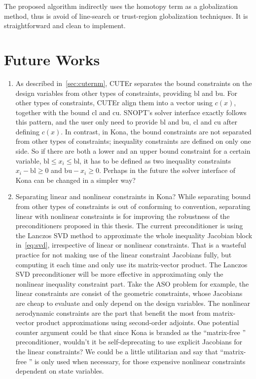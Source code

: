 The proposed algorithm indirectly uses the homotopy term as a globalization method, 
thus is avoid of line-search or trust-region globalization techniques. 
It is straightforward and clean to implement. 

\section{Future Works}

\begin{enumerate}
\item  As described in~\ref{sec:cuternm}, CUTEr separates 
the bound constraints on the design variables from other types of constraints, providing $\text{bl}$ 
and $\text{bu}$. For other types of constraints, CUTEr align them into a vector using $c(x)$, 
together with the bound $\text{cl}$ and $\text{cu}$. SNOPT's solver interface exactly follows this 
pattern, and the user only need to provide $\text{bl}$ and $\text{bu}$,  $\text{cl}$ and $\text{cu}$ 
after defining $c(x)$. In contrast, in Kona, the bound constraints are not separated from other 
types of constraints; inequality constraints are defined on only one side.  
So if there are both a lower and an upper bound constraint for a certain 
variable, $\text{bl} \leq x_i \leq \text{bl}$, it has to be defined as two inequality constraints 
$x_i - \text{bl} \geq 0 $ and $\text{bu} - x_i \geq 0 $. Perhaps in the future the solver interface of Kona 
can be changed in a simpler way?  

\item Separating linear and nonlinear constraints in Kona? While separating bound 
from other types of constraints is out of conforming to convention, separating linear with nonlinear 
constraints is for improving the robustness of the preconditioners proposed in this thesis. 
The current preconditioner is using the Lanczos SVD method to approximate the whole 
inequality Jacobian block in~\ref{eq:svd}, irrespective of linear or nonlinear constraints. 
That is a wasteful practice for not making use of the linear constraint Jacobians fully, but computing it each time 
and only use its matrix-vector product. The Lanczos SVD preconditioner will be more effective in approximating only the nonlinear inequality constraint part. Take the ASO problem for example, 
the linear constraints are consist of the geometric constraints, whose Jacobians are cheap 
to evaluate and only depend on the design variables. The nonlinear aerodynamic constraints are the part that benefit the most from matrix-vector product approximations using second-order adjoints. 
One potential counter argument could be that since Kona is branded as the ``matrix-free '' preconditioner, 
wouldn't it be self-deprecating to use explicit Jacobians for the linear constraints? We could be a little 
utilitarian and say that ``matrix-free '' is only used when necessary, for those expensive nonlinear 
constraints dependent on state variables. 


\end{enumerate}
